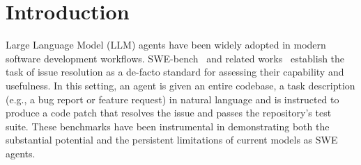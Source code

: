 
\section{Introduction}

Large Language Model (LLM) agents have been widely adopted in modern software development workflows. SWE-bench~\cite{jimenez2024swebench} and related works~\cite{yang2024swebenchmm, zan2024multiswe, yang2024sweagent, zhang2025swebench, swebenchverified} establish the task of issue resolution as a de-facto standard for assessing their capability and usefulness. In this setting, an agent is given an entire codebase, a task description (e.g., a bug report or feature request) in natural language and is instructed to produce a code patch that resolves the issue and passes the repository's test suite. These benchmarks have been instrumental in demonstrating both the substantial potential and the persistent limitations of current models as SWE agents.


